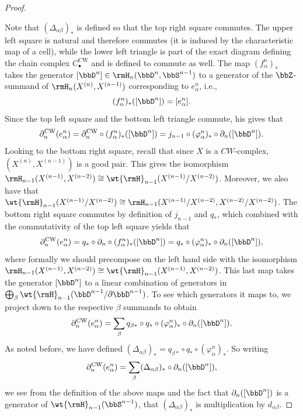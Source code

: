 \begin{proof}
\begin{enumerate}
    \end{enumerate}
    Note that $(\Delta_{\alpha\beta})_\ast$ is defined so that the top right square commutes. The upper left square is natural and therefore commutes (it is induced by the characteristic map of a cell), while the lower left triangle is part of the exact diagram defining the chain complex $C_\bullet^{\mathrm{CW}}$ and is defined to commute as well. The map $(f_\alpha^n)_\ast$ takes the generator $[\bbD^n]\in \rmH_n(\bbD^n,\bbS^{n-1})$ to a generator of the $\bbZ$-summand of $\rmH_n(X^{(n)},X^{(n-1)})$ corresponding to $e^n_\alpha$, i.e., 
    \[(f^n_\alpha)_\ast([\bbD^n])=[e^n_\alpha].\]
    Since the top left square and the bottom left triangle commute, his gives that 
    \[\partial_n^{\mathrm{CW}}(e^n_\alpha)=\partial_n^{\mathrm{CW}}\circ (f^n_\alpha)_\ast([\bbD^n])=j_{n-1}\circ (\varphi_\alpha^n)_\ast\circ \partial_n([\bbD^n]).\]
    Looking to the bottom right square, recall that since $X$ is a $CW$-complex, $(X^{(n)},X^{(n-1)})$ is a good pair. This gives the isomorphism $\rmH_{n-1}(X^{(n-1)},X^{(n-2)})\cong \wt{\rmH}_{n-1}(X^{(n-1)}\slash X^{(n-2)})$. Moreover, we also have that $\wt{\rmH}_{n-1}(X^{(n-1)}\slash X^{(n-2)})\cong \rmH_{n-1}(X^{(n-1)}\slash X^{(n-2)},X^{(n-2)}\slash\allowbreak X^{(n-2)})$. The bottom right square commutes by definition of $j_{n-1}$ and $q_\ast$, which combined with the commutativity of the top left square yields that
    \[\partial_n^{\mathrm{CW}}(e^n_\alpha)=q_\ast\circ \partial_n\circ (f_\alpha^n)_\ast([\bbD^n])=q_\ast\circ (\varphi^n_\alpha)_\ast\circ \partial_n([\bbD^n]),\]
    where formally we should precompose on the left hand side with the isomorphism $\rmH_{n-1}(X^{(n-1)},\allowbreak X^{(n-2)})\cong \wt{\rmH}_{n-1}(X^{(n-1)},X^{(n-2)})$. This last map takes the generator $[\bbD^n]$ to a linear combination of generators in $\bigoplus_\beta \wt{\rmH}_{n-1}(\bbD^{n-1}\slash \partial \bbD^{n-1})$. To see which generators it maps to, we project down to the respective $\beta$ summands to obtain
    \[\partial_n^{\mathrm{CW}}(e^n_\alpha)=\sum_\beta q_{\beta\ast}\circ q_\ast\circ (\varphi^n_\alpha)_\ast\circ \partial_n([\bbD^n]).\]
    As noted before, we have defined $(\Delta_{\alpha\beta})_\ast=q_{\beta\ast}\circ q_\ast\circ (\varphi^n_\alpha)_\ast$. So writing
    \[\partial_n^{\mathrm{CW}}(e^n_\alpha)=\sum_\beta (\Delta_{\alpha\beta})_\ast \circ \partial_n([\bbD^n]),\]
    we see from the definition of the above maps and the fact that $\partial_n([\bbD^n])$ is a generator of $\wt{\rmH}_{n-1}(\bbS^{n-1})$, that $(\Delta_{\alpha\beta})_\ast$ is multiplication by $d_{\alpha\beta}$.
\end{proof}


